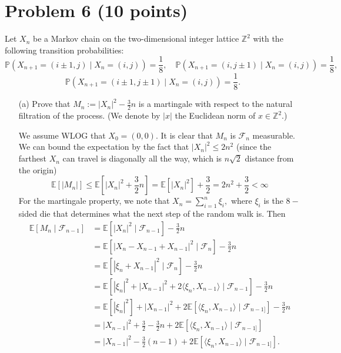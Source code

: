 \documentclass[11pt]{article}
\newcommand{\bbE}{\mathbb{E}}
\begin{document}
\newpage

\section*{Problem 6 (10 points)}
Let \(X_n\) be a Markov chain on the two-dimensional integer lattice \(\mathbb{Z}^2\) with the following transition probabilities:
\[
\mathbb{P}(X_{n+1} = (i \pm 1, j) \mid X_n = (i, j)) = \frac{1}{8}, \quad
\mathbb{P}(X_{n+1} = (i, j \pm 1) \mid X_n = (i, j)) = \frac{1}{8},
\]
\[
\mathbb{P}(X_{n+1} = (i \pm 1, j \pm 1) \mid X_n = (i, j)) = \frac{1}{8}.
\]

\begin{itemize}
    \item[(a)] Prove that \(M_n := |X_n|^2 - \frac{3}{2}n\) is a martingale with respect to the natural filtration of the process. (We denote by \(|x|\) the Euclidean norm of \(x \in \mathbb{Z}^2\).)
    \begin{solution}
We assume WLOG that $X_0 = (0,0).$ It is clear that $M_n$ is $\mathcal{F}_n$ measurable. We can bound the expectation by the fact that $|X_n|^2 \leq 2n^2$ (since the farthest $X_n$ can travel is diagonally all the way, which is $n\sqrt{2}$ distance from the origin)
\[\bbE[|M_n|] \leq  \bbE[|X_n|^2 + \frac{3}{2}n] = \bbE[|X_n|^2] + \frac{3}{2} = 2n^2 + \frac{3}{2} <\infty\] For the martingale property, we note that $X_n = \sum_{i=1}^n \xi_i,$ where $\xi_i$ is the $8-$sided die that determines what the next step of the random walk is. Then 
\begin{align*}
    \bbE[M_n \mid \mathcal{F}_{n-1}] &= \bbE[|X_n|^2 \mid \mathcal{F}_{n-1}] - \frac{3}{2}n\\
    &= \bbE[|X_n - X_{n-1} + X_{n-1}|^2 \mid \mathcal{F}_n] - \frac{3}{2}n\\
    &= \bbE[|\xi_n + X_{n-1}|^2\mid \mathcal{F}_n] - \frac{3}{2}n\\
    &= \bbE[|\xi_n|^2 + |X_{n-1}|^2 + 2\langle\xi_n, X_{n-1}\rangle \mid \mathcal{F}_{n-1}] - \frac{3}{2}n\\
     &= \bbE[|\xi_n|^2] + |X_{n-1}|^2 + 2\bbE[\langle \xi_n, X_{n-1}\rangle \mid \mathcal{F}_{n-1]}]- \frac{3}{2}n\\
     &= |X_{n-1}|^2 + \frac{3}{2} - \frac{3}{2}n + 2\bbE[\langle \xi_n, X_{n-1}\rangle\mid \mathcal{F}_{n-1]}]\\
     &= |X_{n-1}|^2 - \frac{3}{2}(n-1) + 2\bbE[\langle \xi_n, X_{n-1}\rangle \mid \mathcal{F}_{n-1]}].
\end{align*}


\end{solution}
\end{itemize}
\end{document}
